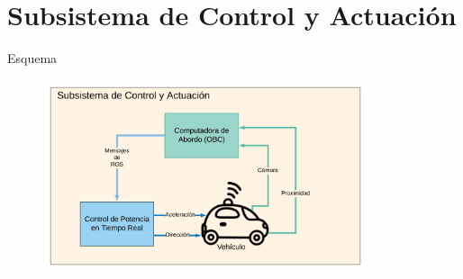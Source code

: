 \documentclass[10pt]{beamer}
\begin{document}
\section{Subsistema de Control y Actuación}
\begin{frame}{Esquema}
    \begin{figure}[!h] 
        \centering
        \includegraphics[width=0.85\textwidth]{../img/control_esq}
        \end{figure}
\end{frame}

    
\end{document}
